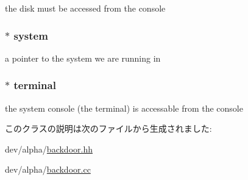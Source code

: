 \label{classAlphaBackdoor_a7a34a11311e1d03257d51166e64c9a9f}
the disk must be accessed from the console \hypertarget{classAlphaBackdoor_a33258b14e97cdadc0a00878bba22adda}{
\subsubsection[{system}]{$\ast$ {\bf system}}}
\label{classAlphaBackdoor_a33258b14e97cdadc0a00878bba22adda}
a pointer to the system we are running in \hypertarget{classAlphaBackdoor_ad511a78bad32e194354d8323bc23a4e3}{
\subsubsection[{terminal}]{$\ast$ {\bf terminal}}}
\label{classAlphaBackdoor_ad511a78bad32e194354d8323bc23a4e3}
the system console (the terminal) is accessable from the console 

このクラスの説明は次のファイルから生成されました:\begin{DoxyCompactItemize}
\item 
dev/alpha/\hyperlink{backdoor_8hh}{backdoor.hh}\item 
dev/alpha/\hyperlink{backdoor_8cc}{backdoor.cc}\end{DoxyCompactItemize}
